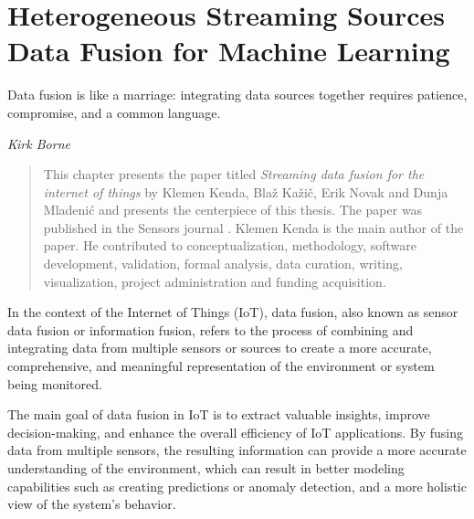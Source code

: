 \chapter{Heterogeneous Streaming Sources Data Fusion for Machine Learning}
\label{ch:data-fusion}

\epigraph{Data fusion is like a marriage: integrating data sources together requires patience, compromise, and a common language.}{\textit{Kirk Borne}}

\begin{quote}
This chapter presents the paper titled \textit{Streaming data fusion for the internet of things} by Klemen Kenda, Blaž Kažič, Erik Novak and Dunja Mladenić and presents the centerpiece of this thesis. The paper was published in the Sensors journal \cite{kenda:2019:fusion}.
Klemen Kenda is the main author of the paper. 
He contributed to conceptualization, methodology, software development, validation, formal analysis, data curation, writing, visualization, project administration and funding acquisition.
\end{quote}

In the context of the Internet of Things (IoT), data fusion, also known as sensor data fusion or information fusion, refers to the process of combining and integrating data from multiple sensors or sources to create a more accurate, comprehensive, and meaningful representation of the environment or system being monitored. 

The main goal of data fusion in IoT is to extract valuable insights, improve decision-making, and enhance the overall efficiency of IoT applications. 
By fusing data from multiple sensors, the resulting information can provide a more accurate understanding of the environment, which can result in better modeling capabilities such as creating predictions or anomaly detection, and a more holistic view of the system's behavior. 

